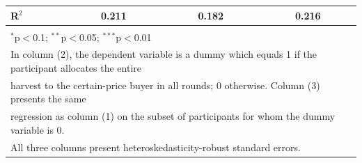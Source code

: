 \begin{table}[!htbp]
\begin{tabular}{@{\extracolsep{5pt}}lccc}
R$^{2}$ & 0.211 & 0.182 & 0.216 \\ 
\hline 
\hline \\[-1.8ex] 
\multicolumn{4}{l}{$^{*}$p$<$0.1; $^{**}$p$<$0.05; $^{***}$p$<$0.01} \\ 
\multicolumn{4}{l}{In column (2), the dependent variable is a dummy which equals 1 if the participant allocates the entire} \\ 
\multicolumn{4}{l}{harvest to the certain-price buyer in all rounds; 0 otherwise. Column (3) presents the same} \\ 
\multicolumn{4}{l}{regression as column (1) on the subset of participants for whom the dummy variable is 0.} \\ 
\multicolumn{4}{l}{All three columns present heteroskedasticity-robust standard errors.} \\ 
\end{tabular} 
\end{table} 
